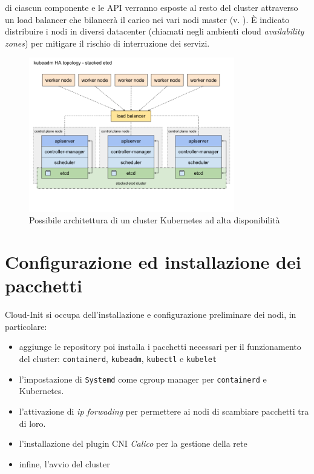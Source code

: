 \documentclass[12pt,a4paper,openright,twoside]{book}
\begin{document}
di ciascun componente e le API verranno esposte al resto del cluster attraverso un load balancer che bilancerà il carico nei vari nodi master (v. ). È indicato distribuire i nodi in diversi datacenter 
(chiamati negli ambienti cloud \textit{availability zones}) per mitigare il rischio di interruzione dei servizi\cite{kubernetes}.
%
\begin{figure}[!hbt]
    \centering
    \includegraphics[width=0.8\textwidth]{figures/kube-ha-topo.png}
    \caption{Possibile architettura di un cluster Kubernetes ad alta disponibilità\cite{kubernetes}}
    \label{fig:kube-ha-topo}
\end{figure}
\FloatBarrier
\section{Configurazione ed installazione dei pacchetti}
Cloud-Init si occupa dell'installazione e configurazione preliminare dei nodi, in particolare:
\begin{itemize}
    \item aggiunge le repository poi installa i pacchetti necessari per il funzionamento del cluster: \texttt{containerd}, \texttt{kubeadm}, \texttt{kubectl} e \texttt{kubelet}
    \item {l'impostazione di \texttt{Systemd} come cgroup manager per \texttt{containerd} e Kubernetes.
        
    }
    \item {
        l'attivazione di \textit{ip forwading} per permettere ai nodi di scambiare pacchetti tra di loro.
        
    }
    \item l'installazione del plugin CNI \textit{Calico} per la gestione della rete
    \item {
        infine, l'avvio del cluster
        
    }
\end{itemize}
\end{document}
